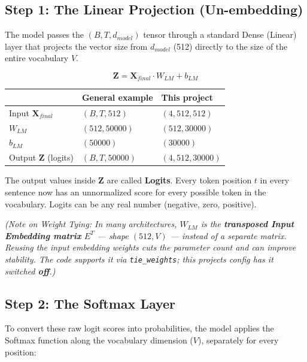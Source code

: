 \documentclass[11pt,a4paper,oneside]{report}
\begin{document}
\subsection{Step 1: The Linear Projection (Un-embedding)}\label{step-1-the-linear-projection-un-embedding}

The model passes the \((B, T, d_{model})\) tensor through a standard Dense (Linear) layer that projects the vector size from \(d_{model}\) (512) directly to the size of the entire vocabulary \(V\).

\[\mathbf{Z} = \mathbf{X}_{final} \cdot W_{LM} + b_{LM}\]

{\def\LTcaptype{none} %
\begin{longtable}[]{@{}lll@{}}
\toprule\noalign{}
& General example & This project \\
\midrule\noalign{}
\endhead
\bottomrule\noalign{}
\endlastfoot
Input \(\mathbf{X}_{final}\) & \((B,\allowbreak T,\allowbreak 512)\) & \((4,\allowbreak 512,\allowbreak 512)\) \\
\(W_{LM}\) & \((512,\allowbreak 50000)\) & \((512,\allowbreak 30000)\) \\
\(b_{LM}\) & \((50000)\) & \((30000)\) \\
Output \(\mathbf{Z}\) (logits) & \((B,\allowbreak T,\allowbreak 50000)\) & \((4,\allowbreak 512,\allowbreak 30000)\) \\
\end{longtable}
}

The output values inside \(\mathbf{Z}\) are called \textbf{Logits}. Every token position \(t\) in every sentence now has an unnormalized score for every possible token in the vocabulary. Logits can be any real number (negative, zero, positive).

\emph{(Note on Weight Tying: In many architectures, \(W_{LM}\) is the \textbf{transposed Input Embedding matrix} \(E^T\) --- shape \((512, V)\) --- instead of a separate matrix. Reusing the input embedding weights cuts the parameter count and can improve stability. The code supports it via \texttt{tie\_\allowbreak{}weights}; this project\textquotesingle s config has it switched \textbf{off}.)}

\subsection{Step 2: The Softmax Layer}\label{step-2-the-softmax-layer}

To convert these raw logit scores into probabilities, the model applies the Softmax function along the vocabulary dimension (\(V\)), separately for every position:
\end{document}
